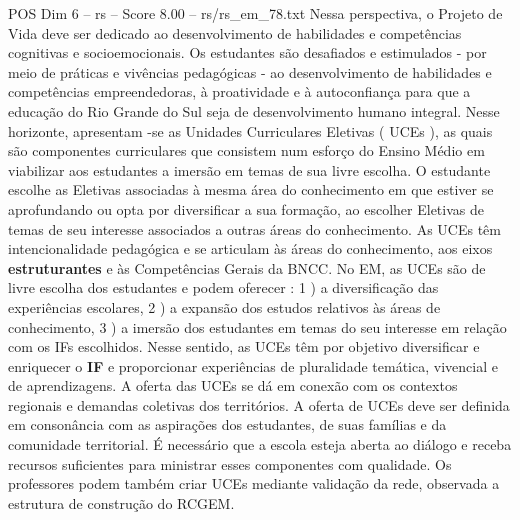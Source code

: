 \begin{textsample}{POS Dim 6 – rs – Score 8.00 – rs/rs\_em\_78.txt}
Nessa perspectiva, o Projeto de Vida deve ser dedicado ao desenvolvimento de habilidades e competências cognitivas e socioemocionais.
Os estudantes são desafiados e estimulados - por meio de práticas e vivências pedagógicas - ao desenvolvimento de habilidades e competências empreendedoras, à proatividade e à autoconfiança para que a educação do Rio Grande do Sul seja de desenvolvimento humano integral.
Nesse horizonte, apresentam -se as Unidades Curriculares Eletivas ( UCEs ), as quais são componentes curriculares que consistem num esforço do Ensino Médio em viabilizar aos estudantes a imersão em temas de sua livre escolha.
O estudante escolhe as Eletivas associadas à mesma área do conhecimento em que estiver se aprofundando ou opta por diversificar a sua formação, ao escolher Eletivas de temas de seu interesse associados a outras áreas do conhecimento.
As UCEs têm intencionalidade pedagógica e se articulam às áreas do conhecimento, aos eixos \textbf{estruturantes} e às Competências Gerais da BNCC.
No EM, as UCEs são de livre escolha dos estudantes e podem oferecer : 1 ) a diversificação das experiências escolares, 2 ) a expansão dos estudos relativos às áreas de conhecimento, 3 ) a imersão dos estudantes em temas do seu interesse em relação com os IFs escolhidos.
Nesse sentido, as UCEs têm por objetivo diversificar e enriquecer o \textbf{IF} e proporcionar experiências de pluralidade temática, vivencial e de aprendizagens.
A oferta das UCEs se dá em conexão com os contextos regionais e demandas coletivas dos territórios.
A oferta de UCEs deve ser definida em consonância com as aspirações dos estudantes, de suas famílias e da comunidade territorial.
É necessário que a escola esteja aberta ao diálogo e receba recursos suficientes para ministrar esses componentes com qualidade.
Os professores podem também criar UCEs mediante validação da rede, observada a estrutura de construção do RCGEM.

\end{textsample}
